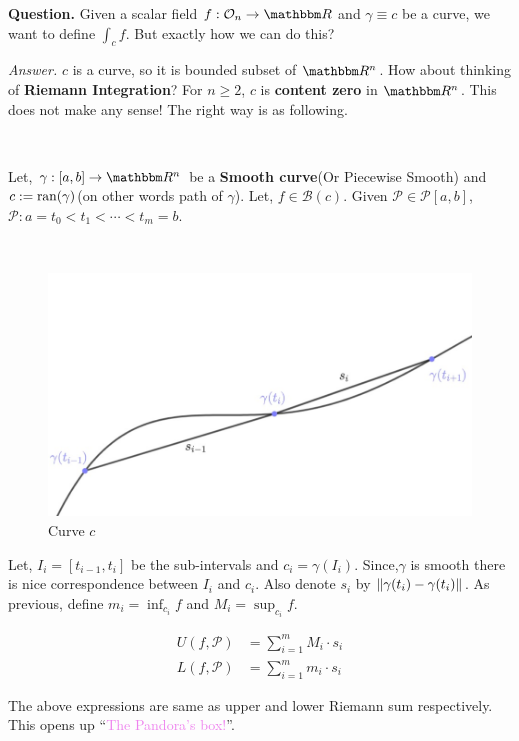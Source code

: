 \documentclass[../Analysis-3]{subfiles}
\begin{document}
\textbf{Question.} Given a scalar field $f : \Op{n} \to \R$ and $\gamma \equiv c$ be a curve, we want to define $\int_c f$. But exactly how we can do this?

\textit{Answer.} $c$ is a curve, so it is bounded subset of $\R^n$. How about thinking of \textbf{Riemann Integration}? For $n \ge 2$, $c$ is \textbf{content zero} in $\R^n$. This does not make any sense! The right way is as following.

\

Let, $\gamma :[a,b]\to \R^n$ be a \textbf{Smooth curve}(Or Piecewise Smooth) and $c:= \operatorname{ran}(\gamma)$(on other words path of $\gamma$). Let, $f \in \mathscr{B}(c)$. Given $\mathcal{P} \in \mathscr{P}[a,b]$, $\mathcal{P} : a = t_0<t_1<\cdots <t_m = b$.

\

\begin{figure}
    \centering
    \includegraphics[width=.98\linewidth]{../figures/lec-23.1.png}
    \caption{Curve $c$}
\end{figure}

Let, $I_i = [t_{i-1},t_i]$ be the sub-intervals and $c_i = \gamma(I_i)$.
Since,$\gamma$ is smooth there is nice correspondence between $I_i$ and $c_i$. Also denote $s_i$ by $\norm{\gamma(t_i) - \gamma(t_i)}$. As previous, define $m_i = \inf_{c_i}f$ and $M_i = \sup_{c_i}f$.

\begin{align*}
    U(f,\mathcal{P}) & = \sum_{i=1}^{m}M_i\cdot s_i \\
    L(f,\mathcal{P}) & = \sum_{i=1}^{m}m_i\cdot s_i
\end{align*}

The above expressions are same as upper and lower Riemann sum respectively. This opens up ``\textcolor{violet}{The Pandora's box!}''.
\end{document}
